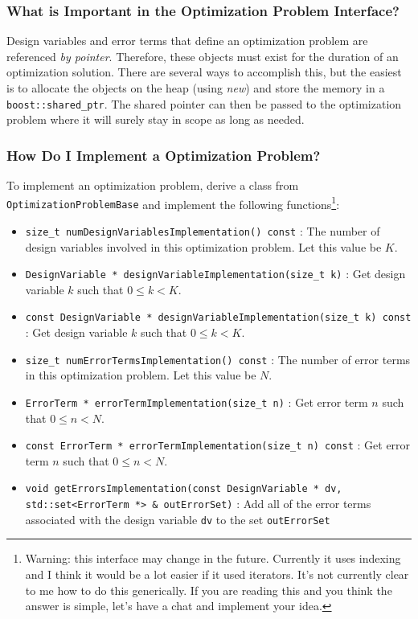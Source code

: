 \documentclass[11pt,a4,oneside]{article}
\newcommand{\txt}[1]{{\footnotesize\texttt{#1}}}
\newcommand{\listcpp}[2]{}
\begin{document}
\listcpp{OptimizationProblem.hpp}{../../aslam_backend/include/aslam/backend/OptimizationProblem.hpp}

\subsubsection{What is Important in the Optimization Problem Interface?}
Design variables and error terms that define an optimization problem are referenced {\em by pointer}. Therefore, these objects must exist for the duration of an optimization solution. There are several ways to accomplish this, but the easiest is to allocate the objects on the heap (using {\em new}) and store the memory in a \txt{boost::shared\_ptr}. The shared pointer can then be passed to the optimization problem where it will surely stay in scope as long as needed.

\subsubsection{How Do I Implement a Optimization Problem?}
To implement an optimization problem, derive a class from \txt{OptimizationProblemBase} and implement the following functions\footnote{Warning: this interface may change in the future. Currently it uses indexing and I think it would be a lot easier if it used iterators. It's not currently clear to me how to do this generically. If you are reading this and you think the answer is simple, let's have a chat and implement your idea.}:
\begin{itemize}
      \item \txt{size\_t numDesignVariablesImplementation() const} : The number of design variables involved in this optimization problem. Let this value be $K$.
      \item \txt{DesignVariable * designVariableImplementation(size\_t k)} : Get design variable $k$ such that $0 \le k < K$.
      \item \txt{const DesignVariable * designVariableImplementation(size\_t k) const} : Get design variable $k$ such that $0 \le k < K$.
      \item \txt{size\_t numErrorTermsImplementation() const} : The number of error terms in this optimization problem. Let this value be $N$.
      \item \txt{ErrorTerm * errorTermImplementation(size\_t n)} : Get error term $n$ such that $0 \le n < N$.
      \item \txt{const ErrorTerm * errorTermImplementation(size\_t n) const} : Get error term $n$ such that $0 \le n < N$.
      \item \txt{void getErrorsImplementation(const DesignVariable * dv, std::set<ErrorTerm *> \& outErrorSet)} : Add all of the error terms associated with the design variable \txt{dv} to the set \txt{outErrorSet}
\end{itemize}
\end{document}
